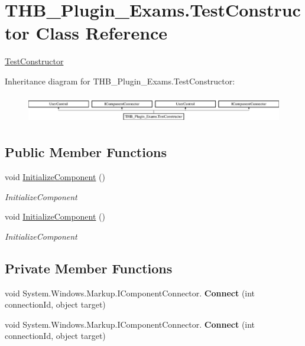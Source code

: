 \hypertarget{class_t_h_b___plugin___exams_1_1_test_constructor}{}\section{T\+H\+B\+\_\+\+Plugin\+\_\+\+Exams.\+Test\+Constructor Class Reference}
\label{class_t_h_b___plugin___exams_1_1_test_constructor}


\mbox{\hyperlink{class_t_h_b___plugin___exams_1_1_test_constructor}{Test\+Constructor}}  


Inheritance diagram for T\+H\+B\+\_\+\+Plugin\+\_\+\+Exams.\+Test\+Constructor\+:\begin{figure}[H]
\begin{center}
\leavevmode
\includegraphics[height=1.261261cm]{d4/d8d/class_t_h_b___plugin___exams_1_1_test_constructor}
\end{center}
\end{figure}
\subsection*{Public Member Functions}
\begin{DoxyCompactItemize}
\item 
void \mbox{\hyperlink{class_t_h_b___plugin___exams_1_1_test_constructor_ad70275bbde2d37af9f1a5c16ee51ebdc}{Initialize\+Component}} ()
\begin{DoxyCompactList}\small\item\em Initialize\+Component \end{DoxyCompactList}\item 
void \mbox{\hyperlink{class_t_h_b___plugin___exams_1_1_test_constructor_ad70275bbde2d37af9f1a5c16ee51ebdc}{Initialize\+Component}} ()
\begin{DoxyCompactList}\small\item\em Initialize\+Component \end{DoxyCompactList}\end{DoxyCompactItemize}
\subsection*{Private Member Functions}
\begin{DoxyCompactItemize}
\item 
\mbox{\label{class_t_h_b___plugin___exams_1_1_test_constructor_a22d27f93166ca180758b1aea7adcf6e0}} 
void System.\+Windows.\+Markup.\+I\+Component\+Connector. {\bfseries Connect} (int connection\+Id, object target)
\item 
\mbox{\label{class_t_h_b___plugin___exams_1_1_test_constructor_a22d27f93166ca180758b1aea7adcf6e0}} 
void System.\+Windows.\+Markup.\+I\+Component\+Connector. {\bfseries Connect} (int connection\+Id, object target)
\end{DoxyCompactItemize}
